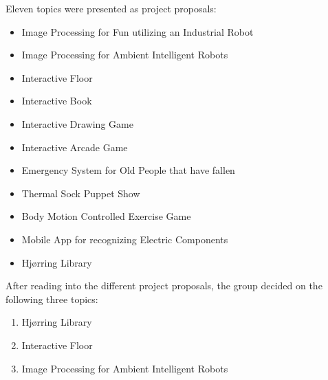 

Eleven topics were presented as project proposals:

\begin{itemize}
\item Image Processing for Fun utilizing an Industrial Robot
\item Image Processing for Ambient Intelligent Robots
\item Interactive Floor
\item Interactive Book
\item Interactive Drawing Game
\item Interactive Arcade Game
\item Emergency System for Old People that have fallen
\item Thermal Sock Puppet Show
\item Body Motion Controlled Exercise Game
\item Mobile App for recognizing Electric Components
\item Hj{\o}rring Library
\end{itemize}

After reading into the different project proposals, the group decided on the following three topics:

\begin{enumerate} 
\item Hj{\o}rring Library 
\item Interactive Floor 
\item Image Processing for Ambient Intelligent Robots 
\end{enumerate}

